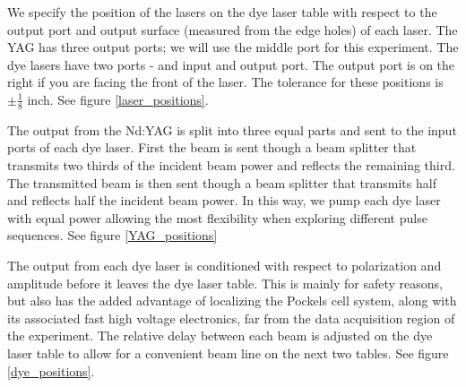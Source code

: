 We specify the position of the lasers on the dye laser table with respect to the output port and output surface (measured from the edge holes) of each laser. The YAG has three output ports; we will use the middle port for this experiment. The dye lasers have two ports - and input and output port. The output port is on the right if you are facing the front of the laser. The tolerance for these positions is $\pm\frac{1}{8}$ inch. See figure \ref{laser_positions}.


The output from the Nd:YAG is split into three equal parts and sent to the input ports of each dye laser. First the beam is sent though a beam splitter that transmits two thirds of the incident beam power and reflects the remaining third. The transmitted beam is then sent though a beam splitter that transmits half and reflects half the incident beam power. In this way, we pump each dye laser with equal power allowing the most flexibility when exploring different pulse sequences. See figure \ref{YAG_positions}


The output from each dye laser is conditioned with respect to polarization and amplitude before it leaves the dye laser table. This is mainly for safety reasons, but also has the added advantage of localizing the Pockels cell system, along with its associated fast high voltage electronics, far from the data acquisition region of the experiment. The relative delay between each beam is adjusted on the dye laser table to allow for a convenient beam line on the next two tables. See figure \ref{dye_positions}.


